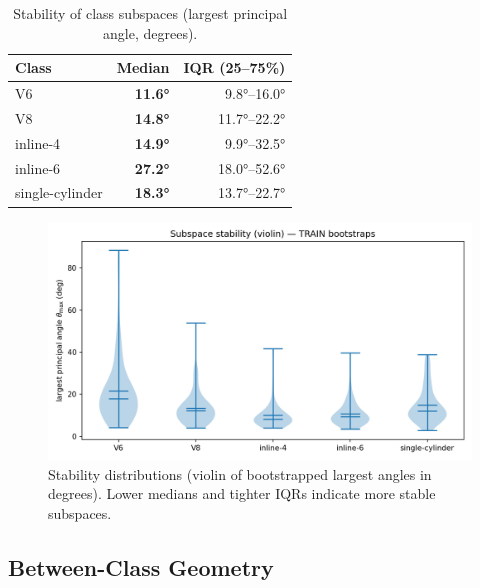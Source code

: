 \documentclass[11pt]{article}
\begin{document}
\begin{table}[!htbp]
\caption{Stability of class subspaces (largest principal angle, degrees).}
\label{tab:stability}
\centering
\begin{tabular}{lrr}
\toprule
\textbf{Class} & \textbf{Median} & \textbf{IQR (25--75\%)} \\
\midrule
V6               & \textbf{\ang{11.6}} & \ang{9.8}--\ang{16.0} \\
V8               & \textbf{\ang{14.8}} & \ang{11.7}--\ang{22.2} \\
inline-4         & \textbf{\ang{14.9}} & \ang{9.9}--\ang{32.5} \\
inline-6         & \textbf{\ang{27.2}} & \ang{18.0}--\ang{52.6} \\
single-cylinder  & \textbf{\ang{18.3}} & \ang{13.7}--\ang{22.7} \\
\bottomrule
\end{tabular}
\end{table}

\begin{figure}[!htbp]
\centering
\includegraphics[width=\linewidth]{stability_violin.png}
\caption{Stability distributions (violin of bootstrapped largest angles in degrees). Lower medians and tighter IQRs indicate more stable subspaces.}
\label{fig:stability}
\end{figure}

\subsection{Between-Class Geometry}
\end{document}
